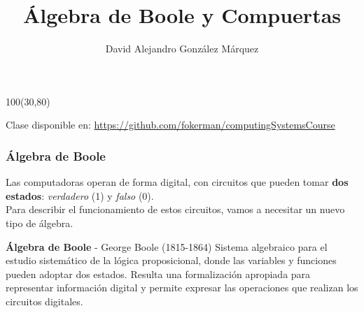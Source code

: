 \documentclass[aspectratio=169]{beamer}
\title{\Huge Álgebra de Boole y Compuertas}
\author{David Alejandro González Márquez}
\date{}
\begin{document}
\begin{frame}[plain]
    \titlepage
    \begin{textblock}{100}(30,80)
    \begin{tcolorbox}[size=small,width=\textwidth,colback={gray!30},title={}]
    \begin{center}
     \scriptsize Clase disponible en: \url{https://github.com/fokerman/computingSystemsCourse}
    \end{center}
    \end{tcolorbox}
    \end{textblock}
\end{frame}

\begin{frame}[fragile]
    \frametitle{Álgebra de Boole}
    Las computadoras operan de forma digital, con circuitos que pueden tomar \textbf{dos estados}: \textit{verdadero} (1) y \textit{falso} (0).\\
    \bigskip
    Para describir el funcionamiento de estos circuitos, vamos a necesitar un nuevo tipo de álgebra.\\
    \bigskip
    \pause
    \begin{block}{\textbf{Álgebra de Boole} {\small- George Boole (1815-1864)}}
    Sistema algebraico para el estudio sistemático de la lógica proposicional, 
    donde las variables y funciones pueden adoptar dos estados.
    Resulta una formalización apropiada para representar información digital y permite expresar las operaciones que realizan los circuitos digitales.
    \end{block}    
\end{frame}
\end{document}
